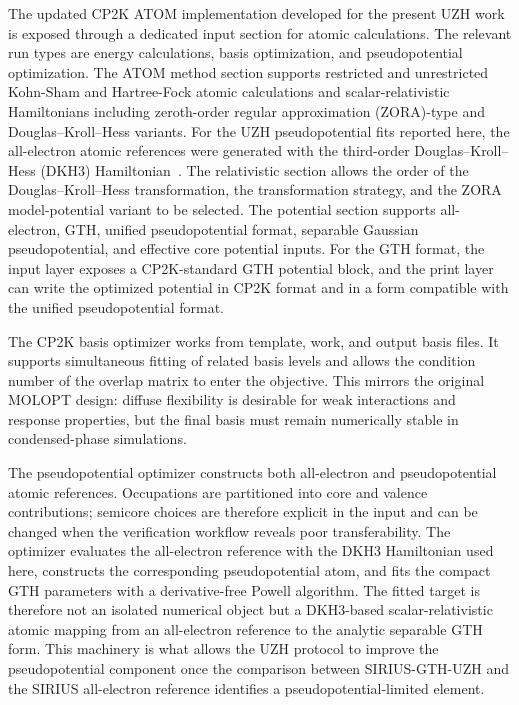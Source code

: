 \documentclass[aps,prb,preprint,amsmath,amssymb,superscriptaddress,longbibliography,floatfix]{revtex4-2}
\newcommand{\TDKin}[1]{\textcolor{blue}{#1}}
\begin{document}
The updated CP2K ATOM implementation developed for the present UZH work is exposed through a dedicated input section for atomic calculations. The relevant run types are energy calculations, basis optimization, and pseudopotential optimization. The ATOM method section supports restricted and unrestricted Kohn-Sham and Hartree-Fock atomic calculations and scalar-relativistic Hamiltonians including zeroth-order regular approximation (ZORA)-type and Douglas--Kroll--Hess variants. For the UZH pseudopotential fits reported here, the all-electron atomic references were generated with the third-order Douglas--Kroll--Hess (DKH3) Hamiltonian\TDKin{~\cite{DouglasKroll1974,Hess1986,NakajimaHirao2000}}. The relativistic section allows the order of the Douglas--Kroll--Hess transformation, the transformation strategy, and the ZORA model-potential variant to be selected. The potential section supports all-electron, GTH, unified pseudopotential format, separable Gaussian pseudopotential, and effective core potential inputs. For the GTH format, the input layer exposes a CP2K-standard GTH potential block, and the print layer can write the optimized potential in CP2K format and in a form compatible with the unified pseudopotential format.

The CP2K basis optimizer works from template, work, and output basis files. It supports simultaneous fitting of related basis levels and allows the condition number of the overlap matrix to enter the objective. This mirrors the original MOLOPT design: diffuse flexibility is desirable for weak interactions and response properties, but the final basis must remain numerically stable in condensed-phase simulations.

The pseudopotential optimizer constructs both all-electron and pseudopotential atomic references. Occupations are partitioned into core and valence contributions; semicore choices are therefore explicit in the input and can be changed when the verification workflow reveals poor transferability. The optimizer evaluates the all-electron reference with the DKH3 Hamiltonian used here, constructs the corresponding pseudopotential atom, and fits the compact GTH parameters with a derivative-free Powell algorithm. The fitted target is therefore not an isolated numerical object but a DKH3-based scalar-relativistic atomic mapping from an all-electron reference to the analytic separable GTH form. This machinery is what allows the UZH protocol to improve the pseudopotential component once the comparison between SIRIUS-GTH-UZH and the SIRIUS all-electron reference identifies a pseudopotential-limited element.
\end{document}
